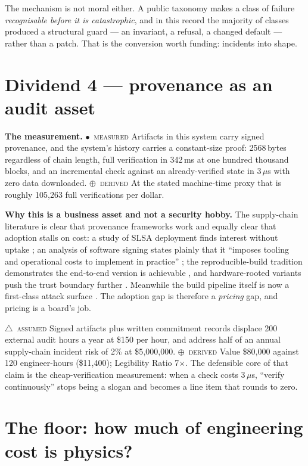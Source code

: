 \documentclass[11pt,a4paper]{article}
\providecommand{\textcite}[1]{\cite{#1}}
\newcommand{\stM}{\textcolor{sigilcyan}{$\bullet$}~{\scriptsize\textsc{measured}}}
\newcommand{\stD}{\textcolor{sigilviolet}{$\oplus$}~{\scriptsize\textsc{derived}}}
\newcommand{\stA}{\textcolor{sigilamber}{$\triangle$}~{\scriptsize\textsc{assumed}}}
\begin{document}
The mechanism is not moral either. A public taxonomy makes a class of failure \emph{recognisable before it is catastrophic}, and in this record the majority of classes produced a structural guard --- an invariant, a refusal, a changed default --- rather than a patch. That is the conversion worth funding: incidents into shape.


\section{Dividend 4 --- provenance as an audit asset}\label{sec:d4}


\textbf{The measurement.} \stM{} Artifacts in this system carry signed provenance, and the system's history carries a constant-size proof: 2568\,bytes regardless of chain length, full verification in 342\,ms at one hundred thousand blocks, and an incremental check against an already-verified state in 3\,$\mu$s with zero data downloaded. \stD{} At the stated machine-time proxy that is roughly 105{,}263 full verifications per dollar.


\textbf{Why this is a business asset and not a security hobby.} The supply-chain literature is clear that provenance frameworks work and equally clear that adoption stalls on cost: a study of SLSA deployment finds interest without uptake \textcite{arxiv2409_05014}; an analysis of software signing states plainly that it ``imposes tooling and operational costs to implement in practice'' \textcite{arxiv2510_04964}; the reproducible-build tradition demonstrates the end-to-end version is achievable \textcite{arxiv2206_14606}, and hardware-rooted variants push the trust boundary further \textcite{arxiv2106_09843}. Meanwhile the build pipeline itself is now a first-class attack surface \textcite{arxiv2601_08995}. The adoption gap is therefore a \emph{pricing} gap, and pricing is a board's job.


\stA{} Signed artifacts plus written commitment records displace 200 external audit hours a year at \$150 per hour, and address half of an annual supply-chain incident risk of 2\% at \$5{,}000{,}000. \stD{} Value \$80{,}000 against 120 engineer-hours (\$11{,}400); Legibility Ratio 7$\times$. The defensible core of that claim is the cheap-verification measurement: when a check costs 3\,$\mu$s, ``verify continuously'' stops being a slogan and becomes a line item that rounds to zero.


\section{The floor: how much of engineering cost is physics?}\label{sec:floor}
\end{document}
